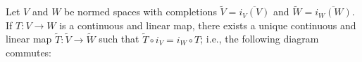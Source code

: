     \begin{theorem}
        Let $V$ and $W$ be normed spaces with completions $\widetilde{V} = \overline{i_V(V)}$ and $\widetilde{W} = \overline{i_W(W)}$. If $T:V \rightarrow W$ is a continuous and linear map, there exists a unique continuous and linear map $\widetilde{T}:\widetilde{V} \rightarrow \widetilde{W}$ such that $\widetilde{T} \circ i_V = i_W \circ T$; i.e., the following diagram commutes:
            \begin{center}
            \end{center}
    \end{theorem}

